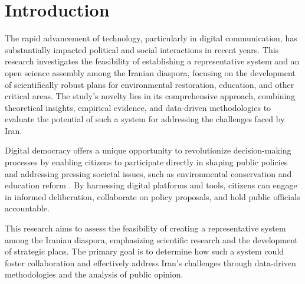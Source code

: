 \documentclass{IEEEtran}
\begin{document}




\section{Introduction}

The rapid advancement of technology, particularly in digital communication, has substantially impacted political and social interactions in recent years. This research investigates the feasibility of establishing a representative system and an open science assembly among the Iranian diaspora, focusing on the development of scientifically robust plans for environmental restoration, education, and other critical areas. The study's novelty lies in its comprehensive approach, combining theoretical insights, empirical evidence, and data-driven methodologies to evaluate the potential of such a system for addressing the challenges faced by Iran.

Digital democracy offers a unique opportunity to revolutionize decision-making processes by enabling citizens to participate directly in shaping public policies and addressing pressing societal issues, such as environmental conservation and education reform \cite{coleman2009internet}. By harnessing digital platforms and tools, citizens can engage in informed deliberation, collaborate on policy proposals, and hold public officials accountable.

This research aims to assess the feasibility of creating a representative system among the Iranian diaspora, emphasizing scientific research and the development of strategic plans. The primary goal is to determine how such a system could foster collaboration and effectively address Iran's challenges through data-driven methodologies and the analysis of public opinion.
\end{document}
